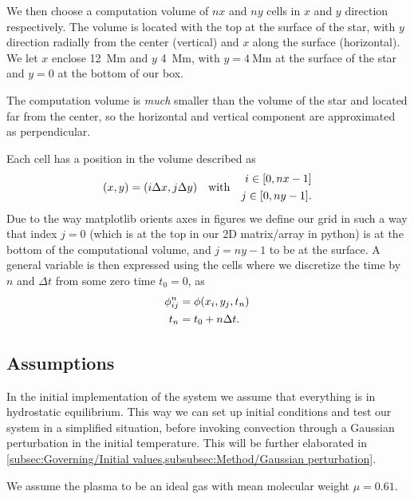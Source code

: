 \documentclass[11pt,a4paper,twocolumn,titlepage]{article}
\begin{document}
We then choose a computation volume of $nx$ and $ny$ cells in $x$ and $y$ direction respectively. The volume is located with the top at the surface of the star, with $y$ direction radially from the center (vertical) and $x$ along the surface (horizontal). We let $x$ enclose \SI{12}{\mega \m} and $y$ \SI{4}{\mega \m}, with $y=\SI{4}{\mega \m}$ at the surface of the star and $y=0$ at the bottom of our box.

The computation volume is \textit{much} smaller than the volume of the star and located far from the center, so the horizontal and vertical component are approximated as perpendicular.

Each cell has a position in the volume described as 
\begin{equation*}
(x,y) = \qty(i\Delta x, j\Delta y) \qq{with}
\begin{aligned}
i \in [0,nx-1]
\\
j \in [0,ny-1].
\end{aligned}
\end{equation*}
Due to the way matplotlib orients axes in figures we define our grid in such a way that index $j=0$ (which is at the top in our 2D matrix/array in python) is at the bottom of the computational volume, and $j=ny-1$ to be at the surface. A general variable is then expressed using the cells where we discretize the time by $n$ and $\Delta t$ from some zero time $t_0=0$, as 
\begin{align*}
\phi_{ij}^n &= \phi\qty(x_i,y_j,t_n)
\\
t_n &= t_0 + n \Delta t.
\end{align*}

\subsection{Assumptions}\label{subsec:Intro/Assumptions}
In the initial implementation of the system we assume that everything is in hydrostatic equilibrium. This way we can set up initial conditions and test our system in a simplified situation, before invoking convection through a Gaussian perturbation in the initial temperature. This will be further elaborated in \cref{subsec:Governing/Initial values,subsubsec:Method/Gaussian perturbation}.

We assume the plasma to be an ideal gas with mean molecular weight $\mu = 0.61$.
\end{document}
